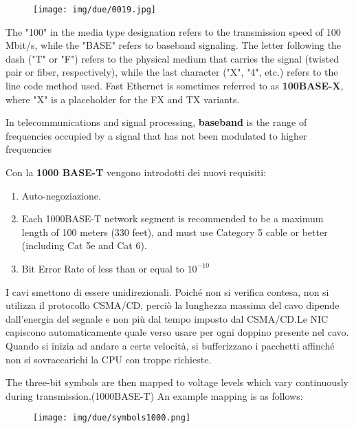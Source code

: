 \documentclass{article}
\begin{document}
\begin{figure}[!ht]
    \begin{center}
        \texttt{[image: img/due/0019.jpg]}         
    \end{center}
\end{figure}

\noindent The "100" in the media type designation refers to the transmission speed of 100 Mbit/s, while the "BASE" refers to baseband signaling.
The letter following the dash ("T" or "F") refers to the physical medium that carries the signal (twisted pair or fiber, respectively), 
while the last character ("X", "4", etc.) refers to the line code method used. Fast Ethernet is sometimes referred to as \textbf{100BASE-X}, 
where "X" is a placeholder for the FX and TX variants.

\noindent In telecommunications and signal processing, \textbf{baseband} is the range of frequencies occupied by a signal that has not been modulated 
to higher frequencies

\noindent Con la \textbf{1000 BASE-T} vengono introdotti dei nuovi requisiti: \begin{enumerate}
    \item Auto-negoziazione.
    \item Each 1000BASE-T network segment is recommended to be a maximum length of 100 meters (330 feet),
    and must use Category 5 cable or better (including Cat 5e and Cat 6). 
    \item Bit Error Rate of less than or equal to $10^{-10}$
\end{enumerate}

\noindent I cavi smettono di essere unidirezionali.  Poiché non si verifica contesa, non si utilizza il protocollo CSMA/CD, perciò la lunghezza massima del cavo 
dipende dall'energia del segnale e non più dal tempo imposto dal CSMA/CD.Le NIC capiscono automaticamente quale verso usare per ogni doppino presente nel cavo.
Quando si inizia ad andare a certe velocità, si bufferizzano i pacchetti affinché non si sovraccarichi la CPU con troppe richieste.
\medskip

\noindent The three-bit symbols are then mapped to voltage levels which vary continuously during transmission.(1000BASE-T) An example mapping 
is as follows: 

\begin{figure}[!ht]
    \begin{center}
        \texttt{[image: img/due/symbols1000.png]}         
    \end{center}
\end{figure}
\end{document}
